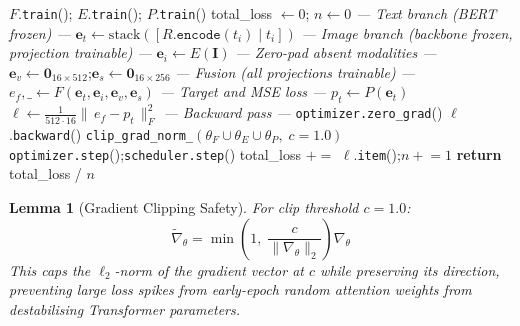 \documentclass[12pt, a4paper]{article}
\theoremstyle{definition}
\theoremstyle{plain}
\newtheorem{lemma}{Lemma}[section]
\theoremstyle{remark}
\begin{document}
\begin{algorithm}[H]
\caption{Single Training Epoch --- Algorithm 5}
\label{alg:train}
\begin{algorithmic}[1]
  \State $F$.\texttt{train}(); $E$.\texttt{train}(); $P$.\texttt{train}()
  \State total\_loss $\gets 0$; $n \gets 0$
    \Statex\qquad\qquad\textit{--- Text branch (BERT frozen) ---}
    \State $\mathbf{e}_t \gets \mathrm{stack}([R.\texttt{encode}(t_i) \mid t_i])$
    \Statex\qquad\qquad\textit{--- Image branch (backbone frozen, projection trainable) ---}
    \State $\mathbf{e}_i \gets E(\mathbf{I})$
           \Comment{$[16, 768]$}
    \Statex\qquad\qquad\textit{--- Zero-pad absent modalities ---}
    \State $\mathbf{e}_v \gets \mathbf{0}_{16\times512}$;\quad $\mathbf{e}_s \gets \mathbf{0}_{16\times256}$
    \Statex\qquad\qquad\textit{--- Fusion (all projections trainable) ---}
    \State $e_f, \_ \gets F(\mathbf{e}_t, \mathbf{e}_i, \mathbf{e}_v, \mathbf{e}_s)$
           \Comment{$[16, 512]$}
    \Statex\qquad\qquad\textit{--- Target and MSE loss ---}
    \State $p_t \gets P(\mathbf{e}_t)$
    \State $\ell \gets \frac{1}{512\cdot16}\|\,e_f - p_t\,\|_F^2$
    \Statex\qquad\qquad\textit{--- Backward pass ---}
    \State \texttt{optimizer.zero\_grad}()
    \State $\ell$.\texttt{backward}()
    \State \texttt{clip\_grad\_norm\_}$(\theta_F \cup \theta_E \cup \theta_P,\;c=1.0)$
    \State \texttt{optimizer.step}();\quad \texttt{scheduler.step}()
    \State total\_loss $\mathrel{+}=$ $\ell$.\texttt{item}();\quad $n \mathrel{+}= 1$
  \EndFor
  \State \textbf{return} total\_loss / $n$
\EndProcedure
\end{algorithmic}
\end{algorithm}

\begin{lemma}[Gradient Clipping Safety]
For clip threshold $c = 1.0$:
\[
  \tilde{\nabla}_\theta =
  \min\!\left(1,\;\frac{c}{\|\nabla_\theta\|_2}\right)\nabla_\theta
\]
This caps the $\ell_2$-norm of the gradient vector at $c$ while preserving
its direction, preventing large loss spikes from early-epoch random attention
weights from destabilising Transformer parameters.
\end{lemma}
\end{document}

